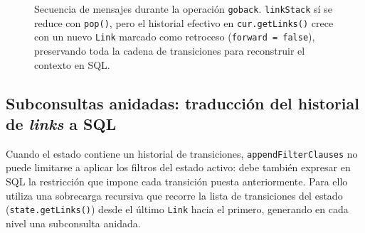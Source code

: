 \begin{figure}[H]
  \centering
  \caption[Diagrama de secuencia de \texttt{goback}]{Secuencia de
  mensajes durante la operación \texttt{goback}. \texttt{linkStack}
  sí se reduce con \texttt{pop()}, pero el historial efectivo en
  \texttt{cur.getLinks()} crece con un nuevo \texttt{Link} marcado
  como retroceso (\texttt{forward = false}), preservando toda la
  cadena de transiciones para reconstruir el contexto en SQL.}
  \label{fig:seqGoback}
\end{figure}

    \subsection{Subconsultas anidadas: traducción del historial de \textit{links} a SQL}

Cuando el estado contiene un historial de transiciones, \texttt{appendFilterClauses}
no puede limitarse a aplicar los filtros del estado activo: debe también expresar en SQL
la restricción que impone cada transición puesta anteriormente. Para ello utiliza una
sobrecarga recursiva que recorre la lista de transiciones del estado
(\texttt{state.getLinks()}) desde el último \texttt{Link} hacia el primero, generando en
cada nivel una subconsulta anidada.

